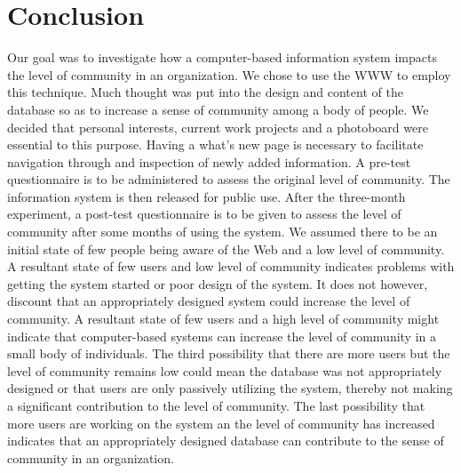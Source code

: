 \section{Conclusion}
Our goal was to investigate how a computer-based information system impacts
the level of community in an organization.  We chose to use the WWW to
employ this technique.  Much thought was put into the design and content of
the database so as to increase a sense of community among a body of people.
We decided that personal interests, current work projects and a photoboard
were essential to this purpose.  Having a what's new page is necessary to
facilitate navigation through and inspection of newly added information.  A
pre-test questionnaire is to be administered to assess the original level
of community.  The information system is then released for public use.
After the three-month experiment, a post-test questionnaire is to be given
to assess the level of community after some months of using the system.  We
assumed there to be an initial state of few people being aware of the Web
and a low level of community.  A resultant state of few users and low level
of community indicates problems with getting the system started or poor
design of the system.  It does not however, discount that an appropriately
designed system could increase the level of community.  A resultant state
of few users and a high level of community might indicate that
computer-based systems can increase the level of community in a small body
of individuals.  The third possibility that there are more users but the
level of community remains low could mean the database was not
appropriately designed or that users are only passively utilizing the
system, thereby not making a significant contribution to the level of
community.  The last possibility that more users are working on the system
an the level of community has increased indicates that an appropriately
designed database can contribute to the sense of community in an
organization.

\appendix

\newpage
